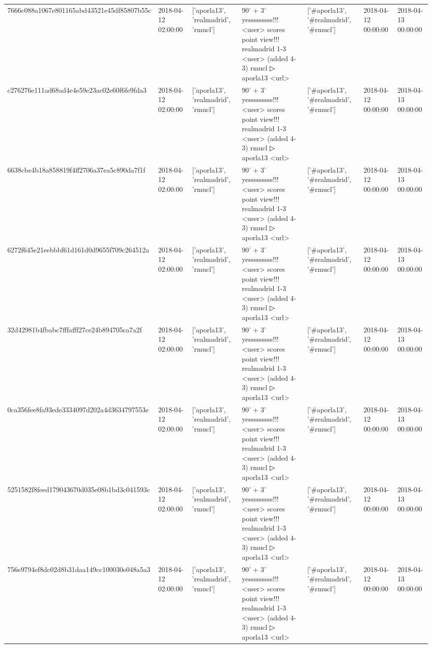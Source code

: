 \begin{tabular}{lllllll}
7666c088a1067e801165abd43521e45df85807b55c & 2018-04-12 02:00:00 & ['aporla13', 'realmadrid', 'rmucl'] & 90' + 3' yesssssssss!!! <user> scores point view!!! realmadrid 1-3 <user> (added 4-3) rmucl ▷ aporla13 <url> & ['#aporla13', '#realmadrid', '#rmucl'] & 2018-04-12 00:00:00 & 2018-04-13 00:00:00 \\
c276276e111ad68ad4e4e59e23ac02e60f6fe9fda3 & 2018-04-12 02:00:00 & ['aporla13', 'realmadrid', 'rmucl'] & 90' + 3' yesssssssss!!! <user> scores point view!!! realmadrid 1-3 <user> (added 4-3) rmucl ▷ aporla13 <url> & ['#aporla13', '#realmadrid', '#rmucl'] & 2018-04-12 00:00:00 & 2018-04-13 00:00:00 \\
6638cbe4b18a858819f4ff2706a37ea5c890da7f1f & 2018-04-12 02:00:00 & ['aporla13', 'realmadrid', 'rmucl'] & 90' + 3' yesssssssss!!! <user> scores point view!!! realmadrid 1-3 <user> (added 4-3) rmucl ▷ aporla13 <url> & ['#aporla13', '#realmadrid', '#rmucl'] & 2018-04-12 00:00:00 & 2018-04-13 00:00:00 \\
6272f645e21eebbbf61d161d0d9655f709c264512a & 2018-04-12 02:00:00 & ['aporla13', 'realmadrid', 'rmucl'] & 90' + 3' yesssssssss!!! <user> scores point view!!! realmadrid 1-3 <user> (added 4-3) rmucl ▷ aporla13 <url> & ['#aporla13', '#realmadrid', '#rmucl'] & 2018-04-12 00:00:00 & 2018-04-13 00:00:00 \\
32d42981b4fbabc7fffafff27ce24b894705ca7a2f & 2018-04-12 02:00:00 & ['aporla13', 'realmadrid', 'rmucl'] & 90' + 3' yesssssssss!!! <user> scores point view!!! realmadrid 1-3 <user> (added 4-3) rmucl ▷ aporla13 <url> & ['#aporla13', '#realmadrid', '#rmucl'] & 2018-04-12 00:00:00 & 2018-04-13 00:00:00 \\
0ca356fee8fa93ede3334097d202a4d3634797553e & 2018-04-12 02:00:00 & ['aporla13', 'realmadrid', 'rmucl'] & 90' + 3' yesssssssss!!! <user> scores point view!!! realmadrid 1-3 <user> (added 4-3) rmucl ▷ aporla13 <url> & ['#aporla13', '#realmadrid', '#rmucl'] & 2018-04-12 00:00:00 & 2018-04-13 00:00:00 \\
5251582f8feed179043670d035e08b1bd3c041593c & 2018-04-12 02:00:00 & ['aporla13', 'realmadrid', 'rmucl'] & 90' + 3' yesssssssss!!! <user> scores point view!!! realmadrid 1-3 <user> (added 4-3) rmucl ▷ aporla13 <url> & ['#aporla13', '#realmadrid', '#rmucl'] & 2018-04-12 00:00:00 & 2018-04-13 00:00:00 \\
756e9794ef8dc02d8b31daa149cc100030e048a5a3 & 2018-04-12 02:00:00 & ['aporla13', 'realmadrid', 'rmucl'] & 90' + 3' yesssssssss!!! <user> scores point view!!! realmadrid 1-3 <user> (added 4-3) rmucl ▷ aporla13 <url> & ['#aporla13', '#realmadrid', '#rmucl'] & 2018-04-12 00:00:00 & 2018-04-13 00:00:00 \\

\end{tabular}
